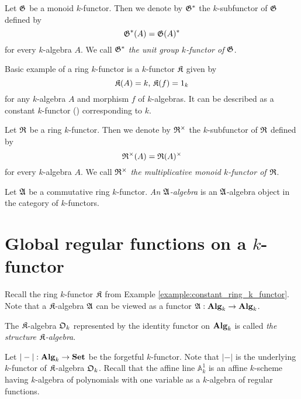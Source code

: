 \begin{example}\label{example:units_k_functor_for_a_monoid}
Let ${\mathfrak G}$ be a monoid $k$-functor. Then we denote by ${\mathfrak G}^*$ the $k$-subfunctor of ${\mathfrak G}$ defined by
$${\mathfrak G}^{*}(A) = {\mathfrak G}(A)^{*}$$
for every $k$-algebra $A$. We call ${\mathfrak G}^{*}$ \textit{the unit group $k$-functor of ${\mathfrak G}$}.
\end{example}

\begin{example}\label{example:constant_ring_k_functor}
Basic example of a ring $k$-functor is a $k$-functor $\mathfrak{K}$ given by
$${\mathfrak K}(A) = k,\,{\mathfrak K}(f) = 1_k$$
for any $k$-algebra $A$ and morphism $f$ of $k$-algebras. It can be described as a constant $k$-functor ({\cite[page 67]{Maclane}}) corresponding to $k$.
\end{example}

\begin{definition}
Let ${\mathfrak R}$ be a ring $k$-functor. Then we denote by ${\mathfrak R}^{\times}$ the $k$-subfunctor of ${\mathfrak R}$ defined by
$${\mathfrak R}^{\times}(A) = {\mathfrak R}(A)^{\times}$$
for every $k$-algebra $A$. We call ${\mathfrak R}^{\times}$ \textit{the multiplicative monoid $k$-functor of ${\mathfrak R}$}.
\end{definition}

\begin{definition}
Let ${\mathfrak A}$ be a commutative ring $k$-functor. \textit{An ${\mathfrak A}$-algebra} is an ${\mathfrak A}$-algebra object in the category of $k$-functors.
\end{definition}

\section{Global regular functions on a $k$-functor}
\noindent
Recall the ring $k$-functor ${\mathfrak K}$ from Example \ref{example:constant_ring_k_functor}. Note that a ${\mathfrak K}$-algebra ${\mathfrak A}$ can be viewed as a functor ${\mathfrak A}:\mathbf{Alg}_k\rightarrow \mathbf{Alg}_k$.

\begin{definition}
The ${\mathfrak K}$-algebra ${\mathfrak O}_k$ represented by the identity functor on $\mathbf{Alg}_k$ is called \textit{the structure ${\mathfrak K}$-algebra}.
\end{definition}
\noindent
Let $|-|:\mathbf{Alg}_k\rightarrow \mathbf{Set}$ be the forgetful $k$-functor. Note that $|-|$ is the underlying $k$-functor of ${\mathfrak K}$-algebra ${\mathfrak O}_k$. Recall that the affine line $\mathbb{A}^1_k$ is an affine $k$-scheme having $k$-algebra of polynomials with one variable as a $k$-algebra of regular functions.

